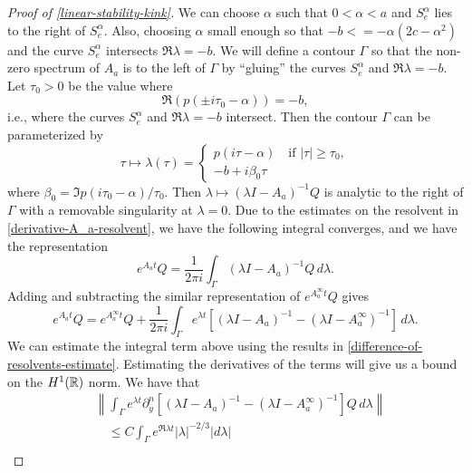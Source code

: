 \begin{proof}[Proof of \cref{linear-stability-kink}]
	We can choose \(\alpha\) such that \(0< \alpha < a\) and \(S_e^\alpha\) lies to the right of \(S_e^\alpha\). Also, choosing \(\alpha \) small enough so that \(-b < = - \alpha (2c - \alpha^2)\) and the curve \(S^\alpha_e\) intersects \(\Re \lambda = -b\). We will define a contour \(\Gamma\) so that the non-zero spectrum of \(A_a\) is to the left of \(\Gamma\) by ``gluing'' the curves \(S_e^\alpha\) and \(\Re \lambda = -b\). Let \(\tau_0> 0\) be the value where
	\begin{equation*} 
		\Re(p(\pm i \tau_0 - \alpha)) = -b,
	\end{equation*} 
	i.e., where the curves \(S^\alpha_e\) and \(\Re \lambda = - b\) intersect. Then the contour \(\Gamma\) can be parameterized by
	\begin{equation*} 
		\tau \mapsto \lambda(\tau) = \begin{cases}
			p(i\tau - \alpha) \quad \text{if } |\tau|\geq \tau_0,\\
			- b + i \beta_0 \tau
		\end{cases}
	\end{equation*} 
	where \(\beta_0 = \Im p(i\tau_0 - \alpha) / \tau_0\). Then \(\lambda \mapsto (\lambda I - A_a)^{-1} Q\) is analytic to the right of \(\Gamma\) with a removable singularity at \(\lambda = 0\). Due to the estimates on the resolvent in \cref{derivative-A_a-resolvent}, we have the following integral converges, and we have the representation
	\begin{equation*} 
		e^{A_at} Q = \frac 1 {2\pi i} \int_\Gamma (\lambda I - A_a)^{-1} Q\, d\lambda.
	\end{equation*} 
	Adding and subtracting the similar representation of \(e^{A_a^\infty t} Q\) gives
	\begin{equation}\label{semigroup-operator-aa}
		e^{A_at} Q = e^{A_a^\infty t} Q + \frac 1 {2 \pi i } \int_\Gamma e^{\lambda t} [ (\lambda I - A_a)^{-1} - (\lambda I - A_a^\infty)^{-1}] \, d\lambda.
	\end{equation}
	We can estimate the integral term above using the results in \cref{difference-of-resolvents-estimate}. Estimating the derivatives of the terms will give us a bound on the \(H^1(\mathbb{R})\) norm. We have that
	\begin{equation*} 
		\begin{aligned}
			&\left \| \int_\Gamma e^{\lambda t} \partial_y^n [(\lambda I - A_a)^{-1}  - (\lambda I - A_a^\infty)^{-1}] Q \, d\lambda \right \| \\
			&\quad\leq C \int_\Gamma e^{\Re \lambda t} |\lambda|^{-2/3} |d\lambda| \\

\end{aligned}
\end{equation*}
\end{proof}

